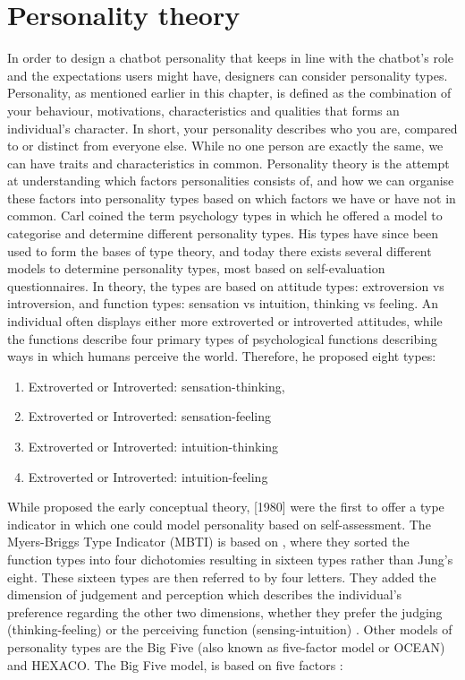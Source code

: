 \vspace{5mm} %

\section{Personality theory}
In order to design a chatbot personality that keeps in line with the chatbot's role and the expectations users might have, designers can consider personality types. Personality, as mentioned earlier in this chapter, is defined as the combination of your behaviour, motivations, characteristics and qualities that forms an individual's character. In short, your personality describes who you are, compared to or distinct from everyone else. While no one person are exactly the same, we can have traits and characteristics in common. Personality theory is the attempt at understanding which factors personalities consists of, and how we can organise these factors into personality types based on which factors we have or have not in common. Carl \cite{Jung1923} coined the term psychology types in which he offered a model to categorise and determine different personality types. His types have since been used to form the bases of type theory, and today there exists several different models to determine personality types, most based on self-evaluation questionnaires. In \cite{Jung1923} theory, the types are based on attitude types: extroversion vs introversion, and function types: sensation vs intuition, thinking vs feeling. An individual often displays either more extroverted or introverted attitudes, while the functions describe four primary types of psychological functions describing ways in which humans perceive the world. Therefore, he proposed eight types:

\begin{enumerate}
    \item Extroverted or Introverted: sensation-thinking, 
    \item Extroverted or Introverted: sensation-feeling
    \item Extroverted or Introverted: intuition-thinking
    \item Extroverted or Introverted: intuition-feeling
\end{enumerate}

While \cite{Jung1923} proposed the early conceptual theory, \cite{Myers2010}[1980]  were the first to offer a type indicator in which one could model personality based on self-assessment. The Myers-Briggs Type Indicator (MBTI) is based on \cite{Jung1923}, where they sorted the function types into four dichotomies resulting in sixteen types rather than Jung's eight. These sixteen types are then referred to by four letters. They added the dimension of judgement and perception which describes the individual's preference regarding the other two dimensions, whether they prefer the judging (thinking-feeling) or the perceiving function (sensing-intuition) \citep{Myers2010}. Other models of personality types are the Big Five (also known as five-factor model or OCEAN) and HEXACO. The Big Five model, is based on five factors \citep{toegel2012}:

